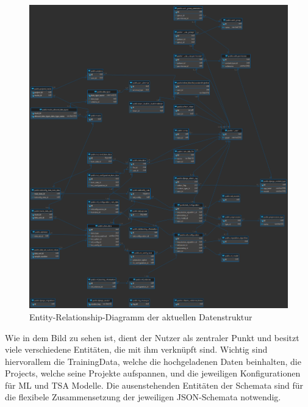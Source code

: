 \begin{figure}[ht]
    \centering
    \includegraphics[width=1\textwidth]{includes/figures/database/software.png}
    \caption{Entity-Relationship-Diagramm der aktuellen Datenstruktur}
    \label{fig:datamodel_new_version}
\end{figure}

Wie in dem Bild zu sehen ist, dient der Nutzer als zentraler Punkt und besitzt viele verschiedene Entitäten, die mit ihm verknüpft sind. Wichtig sind hiervorallem die TrainingData, welche die hochgeladenen Daten beinhalten, die Projects, welche seine Projekte aufspannen, und die jeweiligen Konfigurationen für \ac{ML} und \ac{TSA} Modelle.
Die ausenstehenden Entitäten der Schemata sind für die flexibele Zusammensetzung der jeweiligen JSON-Schemata notwendig.
